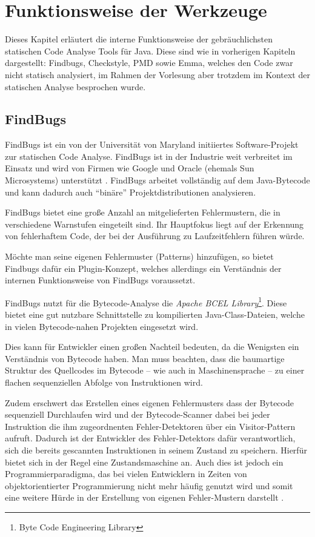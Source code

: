 \section{Funktionsweise der Werkzeuge}

Dieses Kapitel erläutert die interne Funktionsweise der gebräuchlichsten statischen Code Analyse Tools für Java. Diese sind wie in vorherigen Kapiteln dargestellt: Findbugs, Checkstyle, PMD sowie Emma, welches den Code zwar nicht statisch analysiert, im Rahmen der Vorlesung aber trotzdem im Kontext der statischen Analyse besprochen wurde.


\subsection{FindBugs}

FindBugs ist ein von der Universität von Maryland initiiertes Software-Projekt zur statischen Code Analyse. FindBugs ist in der Industrie weit verbreitet im Einsatz und wird von Firmen wie Google und Oracle (ehemals Sun Microsystems) unterstützt \citep{findbugsUser}.
FindBugs arbeitet vollständig auf dem Java-Bytecode und kann dadurch auch ``binäre'' Projektdistributionen analysieren. 

FindBugs bietet eine große Anzahl an mitgelieferten Fehlermustern, die in verschiedene Warnstufen eingeteilt sind. Ihr Hauptfokus liegt auf der Erkennung von fehlerhaftem Code, der bei der Ausführung zu Laufzeitfehlern führen würde.

Möchte man seine eigenen Fehlermuster (Patterns) hinzufügen, so bietet Findbugs dafür ein Plugin-Konzept, welches allerdings ein Verständnis der internen Funktionsweise von FindBugs voraussetzt.
 
FindBugs nutzt für die Bytecode-Analyse die \textit{Apache BCEL Library}\footnote{Byte Code Engineering Library}. Diese bietet eine gut nutzbare Schnittstelle zu kompilierten Java-Class-Dateien, welche in vielen Bytecode-nahen Projekten eingesetzt wird. %

Dies kann für Entwickler einen großen Nachteil bedeuten, da die Wenigsten ein Verständnis von Bytecode haben. Man muss beachten, dass die baumartige Struktur des Quellcodes im Bytecode -- wie auch in Maschinensprache -- zu einer flachen sequenziellen Abfolge von Instruktionen wird. 

Zudem erschwert das Erstellen eines eigenen Fehlermusters dass der Bytecode sequenziell Durchlaufen wird und der Bytecode-Scanner dabei bei jeder Instruktion die ihm zugeordnenten Fehler-Detektoren über ein Visitor-Pattern aufruft. 
Dadurch ist der Entwickler des Fehler-Detektors dafür verantwortlich, sich die bereits gescannten Instruktionen in seinem Zustand zu speichern. Hierfür bietet sich in der Regel eine Zustandsmaschine an. Auch dies ist jedoch ein Programmierparadigma, das bei vielen Entwicklern in Zeiten von objektorientierter Programmierung nicht mehr häufig genutzt wird und somit eine weitere Hürde in der Erstellung von eigenen Fehler-Mustern darstellt \citep{findbugsDetector}.

